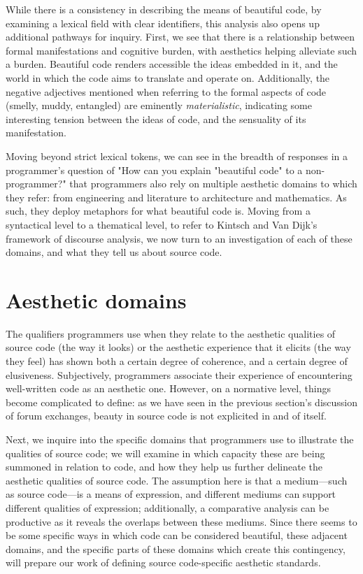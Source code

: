 While there is a consistency in describing the means of beautiful code, by examining a lexical field with clear identifiers, this analysis also opens up additional pathways for inquiry. First, we see that there is a relationship between formal manifestations and cognitive burden, with aesthetics helping alleviate such a burden. Beautiful code renders accessible the ideas embedded in it, and the world in which the code aims to translate and operate on. Additionally, the negative adjectives mentioned when referring to the formal aspects of code (smelly, muddy, entangled) are eminently \emph{materialistic}, indicating some interesting tension between the ideas of code, and the sensuality of its manifestation.

Moving beyond strict lexical tokens, we can see in the breadth of responses in a programmer's question of "How can you explain "beautiful code" to a non-programmer?" \citep{stackoverflow_how_2013} that programmers also rely on multiple aesthetic domains to which they refer: from engineering and literature to architecture and mathematics. As such, they deploy metaphors for what beautiful code is. Moving from a syntactical level to a thematical level, to refer to Kintsch and Van Dijk's framework of discourse analysis, we now turn to an investigation of each of these domains, and what they tell us about source code.

\section{Aesthetic domains}
\label{sec:aesthetic-domains}

The qualifiers programmers use when they relate to the aesthetic qualities of source code (the way it looks) or the aesthetic experience that it elicits (the way they feel) has shown both a certain degree of coherence, and a certain degree of elusiveness. Subjectively, programmers associate their experience of encountering well-written code as an aesthetic one. However, on a normative level, things become complicated to define: as we have seen in the previous section's discussion of forum exchanges, beauty in source code is not explicited in and of itself.

Next, we inquire into the specific domains that programmers use to illustrate the qualities of source code; we will examine in which capacity these are being summoned in relation to code, and how they help us further delineate the aesthetic qualities of source code. The assumption here is that a medium—such as source code—is a means of expression, and different mediums can support different qualities of expression; additionally, a comparative analysis can be productive as it reveals the overlaps between these mediums. Since there seems to be some specific ways in which code can be considered beautiful, these adjacent domains, and the specific parts of these domains which create this contingency, will prepare our work of defining source code-specific aesthetic standards.

